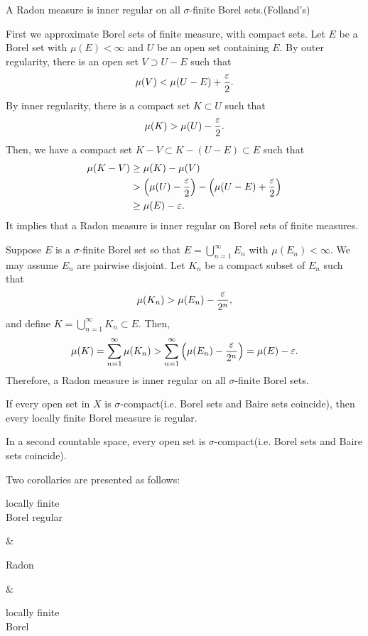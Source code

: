 \documentclass{../note}
\begin{document}
\begin{prop}
A Radon measure is inner regular on all $\sigma$-finite Borel sets.(Folland's)
\end{prop}
\begin{pf}
First we approximate Borel sets of finite measure, with compact sets.
Let $E$ be a Borel set with $\mu(E)<\infty$ and $U$ be an open set containing $E$.
By outer regularity, there is an open set $V\supset U-E$ such that
\[\mu(V)<\mu(U-E)+\frac{\varepsilon}2.\]
By inner regularity, there is a compact set $K\subset U$ such that
\[\mu(K)>\mu(U)-\frac{\varepsilon}2.\]
Then, we have a compact set $K-V\subset K-(U-E)\subset E$ such that
\begin{align*}
\mu(K-V)&\ge\mu(K)-\mu(V)\\
&>\left(\mu(U)-\frac{\varepsilon}2\right)-\left(\mu(U-E)+\frac{\varepsilon}2\right)\\
&\ge\mu(E)-\varepsilon.
\end{align*}
It implies that a Radon measure is inner regular on Borel sets of finite measures.

Suppose $E$ is a $\sigma$-finite Borel set so that $E=\bigcup_{n=1}^\infty E_n$ with $\mu(E_n)<\infty$.
We may assume $E_n$ are pairwise disjoint.
Let $K_n$ be a compact subset of $E_n$ such that
\[\mu(K_n)>\mu(E_n)-\frac{\varepsilon}{2^n},\]
and define $K=\bigcup_{n=1}^\infty K_n\subset E$.
Then,
\[\mu(K)=\sum_{n=1}^\infty\mu(K_n)>\sum_{n=1}^\infty\left(\mu(E_n)-\frac{\varepsilon}{2^n}\right)=\mu(E)-\varepsilon.\]
Therefore, a Radon measure is inner regular on all $\sigma$-finite Borel sets.
\end{pf}

\begin{thm}
If every open set in $X$ is $\sigma$-compact(i.e. Borel sets and Baire sets coincide), then every locally finite Borel measure is regular.
\end{thm}
\begin{prop}
In a second countable space, every open set is $\sigma$-compact(i.e. Borel sets and Baire sets coincide).
\end{prop}


Two corollaries are presented as follows:
\begin{rd}[column sep={120pt,between origins}]
\parbox{7em}{\centering locally finite \\ Borel regular} \rar &
\parbox{5em}{\centering Radon} \rar {} &
\parbox{7em}{\centering locally finite \\ Borel} 
\end{rd}
\end{document}
